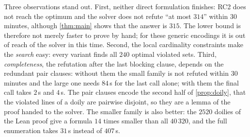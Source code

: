 \documentclass[11pt]{article}
\theoremstyle{definition}
\theoremstyle{remark}
\begin{document}
\begin{table}[ht]
\centering\small
{}
\caption{Formulations of the degree problem for $Q_0$, solved by CaDiCaL~1.5.3 through PySAT (RC2 with its default Glucose~3 oracle) on the machine of \cref{sec:costs}, one thread, $30$-minute limit. For the enumerations, the times are until the last of the $240$ violated sets is found and until the final formula is refuted.}
\label{tab:ablation}
\end{table}

Three observations stand out.
First, neither direct formulation finishes: RC2 does not reach the optimum and the solver does not refute ``at most $314$'' within $30$ minutes, although \cref{thm:main} shows that the answer is $315$.
The lower bound is therefore not merely faster to prove by hand; for these generic encodings it is out of reach of the solver in this time.
Second, the local cardinality constraints make the \emph{search} easy: every variant finds all $240$ optimal violated sets.
Third, \emph{completeness}, the refutation after the last blocking clause, depends on the redundant pair clauses: without them the small family is not refuted within $30$ minutes and the large one needs $84$\,s for the last call alone; with them the final call takes $2$\,s and $4$\,s.
The pair clauses encode the second half of \cref{prop:doily}, that the violated lines of a doily are pairwise disjoint, so they are a lemma of the proof handed to the solver.
The smaller family is also better: the $2520$ doilies of the Lean proof give a formula $14$ times smaller than all $40\,320$, and the full enumeration takes $31$\,s instead of $407$\,s.
\end{document}
